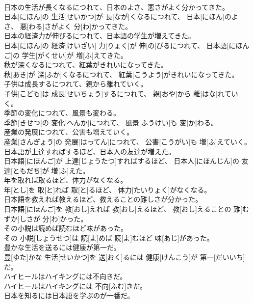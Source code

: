 \documentclass[8pt]{extreport}
\begin{document}
\begin{CJK}{UTF8}{min}
\\	日本の生活が長くなるにつれて、日本のよさ、悪さがよく分かってきた。	
\\	日本[にほん]の 生活[せいかつ]が 長[なが]くなるにつれて、 日本[にほん]のよさ、 悪[わる]さがよく 分[わ]かってきた。
\\	日本の経済力が伸びるにつれて、日本語の学生が増えてきた。	
\\	日本[にほん]の 経済[けいざい] 力[りょく]が 伸[の]びるにつれて、 日本語[にほんご]の 学生[がくせい]が 増[ふ]えてきた。
\\	秋が深くなるにつれて、紅葉がきれいになってきた。	
\\	秋[あき]が 深[ふか]くなるにつれて、 紅葉[こうよう]がきれいになってきた。
\\	子供は成長するにつれて、親から離れていく。	
\\	子供[こども]は 成長[せいちょう]するにつれて、 親[おや]から 離[はな]れていく。
\\	季節の変化につれて、風景も変わる。	
\\	季節[きせつ]の 変化[へんか]につれて、 風景[ふうけい]も 変[か]わる。
\\	産業の発展につれて、公害も増えていく。	
\\	産業[さんぎょう]の 発展[はってん]につれて、 公害[こうがい]も 増[ふ]えていく。
\\	日本語が上達すればするほど、日本人の友達が増えた。	
\\	日本語[にほんご]が 上達[じょうたつ]すればするほど、 日本人[にほんじん]の 友達[ともだち]が 増[ふ]えた。
\\	年を取れば取るほど、体力がなくなる。	
\\	年[とし]を 取[と]れば 取[と]るほど、 体力[たいりょく]がなくなる。
\\	日本語を教えれば教えるほど、教えることの難しさが分かった。	
\\	日本語[にほんご]を 教[おし]えれば 教[おし]えるほど、 教[おし]えることの 難[むずか]しさが 分[わ]かった。
\\	その小説は読めば読むほど味があった。	
\\	その 小説[しょうせつ]は 読[よ]めば 読[よ]むほど 味[あじ]があった。
\\	豊かな生活を送るには健康が第一だ。	
\\	豊[ゆた]かな 生活[せいかつ]を 送[おく]るには 健康[けんこう]が 第一[だいいち]だ。
\\	ハイヒールはハイキングには不向きだ。	
\\	ハイヒールはハイキングには 不向[ふむ]きだ。
\\	日本を知るには日本語を学ぶのが一番だ。	

\end{CJK}
\end{document}
